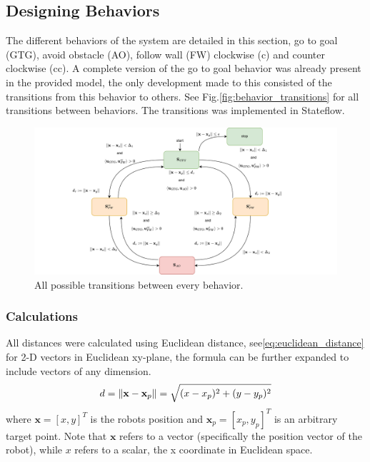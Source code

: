 
\subsection{Designing Behaviors}

The different behaviors of the system are detailed in this section, go to goal (GTG), avoid obstacle (AO), follow wall (FW) clockwise (c) and counter clockwise (cc).
A complete version of the go to goal behavior was already present in the provided model, the only development made to this consisted of the transitions from this behavior to others. See Fig.\:\eqref{fig:behavior_transitions} for all transitions between behaviors. The transitions was implemented in Stateflow.
\begin{figure}
    \centering
    \includegraphics[width=\columnwidth]{images/flowchat_lab1.png}
    \caption{All possible transitions between every behavior.}
    \label{fig:behavior_transitions}
\end{figure}




\subsubsection{Calculations}
All distances were calculated using Euclidean distance, see\:\eqref{eq:euclidean_distance} for 2-D vectors in Euclidean xy-plane, the formula can be further expanded to include vectors of any dimension.
\begin{equation}
    \label{eq:euclidean_distance}
    d = \left\lVert \mathbf{x} - \mathbf{x}_p \right\rVert = \sqrt{(x-x_p)^2 + (y-y_p)^2}
\end{equation}
where $\mathbf{x} = [x,y]^T$ is the robots position and $\mathbf{x}_p = [x_p, y_p]^T$ is an arbitrary target point.
Note that $\mathbf{x}$ refers to a vector (specifically the position vector of the robot), while $x$ refers to a scalar, the x coordinate in Euclidean space.


